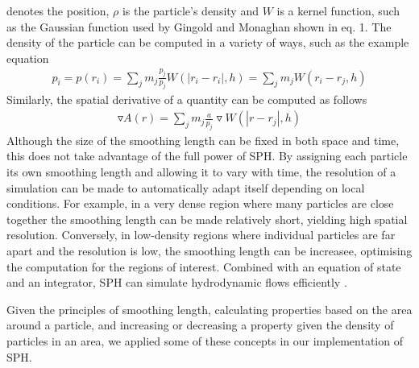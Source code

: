 \documentclass{sigchi}
\begin{document}
denotes the position, $\rho$ is the particle's density and $W$ is a kernel function, such as the 
Gaussian function used by Gingold and Monaghan shown in eq. 1. The density of 
the particle can be computed in a variety of ways, such as the example equation
\begin{align}
p_i = p(r_i) = \sum_{j} m_j \frac{p_j}{p_j} W (|r_i - r_i|,h) = \sum_{j} m_j W(r_i - r_j,h)
\end{align}
Similarly, the spatial derivative of a quantity can be computed as follows
\begin{align}
\triangledown A(r) = \sum_{j} m_j \frac{a}{p_j} \triangledown W(|r - r_j|, h)
\end{align}
Although the size of the smoothing length can be fixed in both space and time, this does 
not take advantage of the full power of SPH. By assigning each particle its own smoothing 
length and allowing it to vary with time, the resolution of a simulation can be made to 
automatically adapt itself depending on local conditions. For example, in a very dense 
region where many particles are close together the smoothing length can be made relatively 
short, yielding high spatial resolution. Conversely, in low-density regions where 
individual particles are far apart and the resolution is low, the smoothing length can be 
increasee, optimising the computation for the regions of interest. Combined with an 
equation of state and an integrator, SPH can simulate hydrodynamic flows efficiently \cite{wikiarticle}.
\par\medskip
%
Given the principles of smoothing length, calculating properties based on 
the area around a particle, and increasing or decreasing a property given the density of 
particles in an area, we applied some of these concepts in our implementation of SPH.
%
\clearpage
\end{document}
